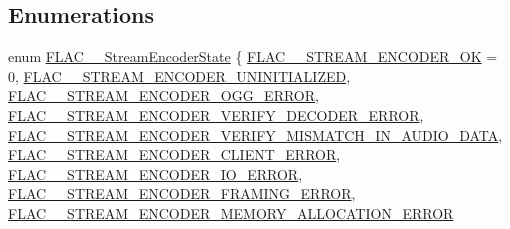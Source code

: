 \subsection*{Enumerations}
\begin{DoxyCompactItemize}
\item 
enum \mbox{\hyperlink{group__flac__stream__encoder_gac5e9db4fc32ca2fa74abd9c8a87c02a5}{F\+L\+A\+C\+\_\+\+\_\+\+Stream\+Encoder\+State}} \{ \newline
\mbox{\hyperlink{group__flac__stream__encoder_ggac5e9db4fc32ca2fa74abd9c8a87c02a5a3a6666ae61a64d955341cec285695bf6}{F\+L\+A\+C\+\_\+\+\_\+\+S\+T\+R\+E\+A\+M\+\_\+\+E\+N\+C\+O\+D\+E\+R\+\_\+\+OK}} = 0, 
\mbox{\hyperlink{group__flac__stream__encoder_ggac5e9db4fc32ca2fa74abd9c8a87c02a5a04912e04a3c57d3c53de34742f96d635}{F\+L\+A\+C\+\_\+\+\_\+\+S\+T\+R\+E\+A\+M\+\_\+\+E\+N\+C\+O\+D\+E\+R\+\_\+\+U\+N\+I\+N\+I\+T\+I\+A\+L\+I\+Z\+ED}}, 
\mbox{\hyperlink{group__flac__stream__encoder_ggac5e9db4fc32ca2fa74abd9c8a87c02a5abb312cc8318c7a541cadacd23ceb3bbb}{F\+L\+A\+C\+\_\+\+\_\+\+S\+T\+R\+E\+A\+M\+\_\+\+E\+N\+C\+O\+D\+E\+R\+\_\+\+O\+G\+G\+\_\+\+E\+R\+R\+OR}}, 
\mbox{\hyperlink{group__flac__stream__encoder_ggac5e9db4fc32ca2fa74abd9c8a87c02a5a4cb80be4f83eb71f04e74968af1d259e}{F\+L\+A\+C\+\_\+\+\_\+\+S\+T\+R\+E\+A\+M\+\_\+\+E\+N\+C\+O\+D\+E\+R\+\_\+\+V\+E\+R\+I\+F\+Y\+\_\+\+D\+E\+C\+O\+D\+E\+R\+\_\+\+E\+R\+R\+OR}}, 
\newline
\mbox{\hyperlink{group__flac__stream__encoder_ggac5e9db4fc32ca2fa74abd9c8a87c02a5a011e3d8b2d02a940bfd0e59c05cf5ae0}{F\+L\+A\+C\+\_\+\+\_\+\+S\+T\+R\+E\+A\+M\+\_\+\+E\+N\+C\+O\+D\+E\+R\+\_\+\+V\+E\+R\+I\+F\+Y\+\_\+\+M\+I\+S\+M\+A\+T\+C\+H\+\_\+\+I\+N\+\_\+\+A\+U\+D\+I\+O\+\_\+\+D\+A\+TA}}, 
\mbox{\hyperlink{group__flac__stream__encoder_ggac5e9db4fc32ca2fa74abd9c8a87c02a5a8c2b2e9efb43a4f9b25b1d2bd9af5f23}{F\+L\+A\+C\+\_\+\+\_\+\+S\+T\+R\+E\+A\+M\+\_\+\+E\+N\+C\+O\+D\+E\+R\+\_\+\+C\+L\+I\+E\+N\+T\+\_\+\+E\+R\+R\+OR}}, 
\mbox{\hyperlink{group__flac__stream__encoder_ggac5e9db4fc32ca2fa74abd9c8a87c02a5af0e4738522e05a7248435c7148f58f91}{F\+L\+A\+C\+\_\+\+\_\+\+S\+T\+R\+E\+A\+M\+\_\+\+E\+N\+C\+O\+D\+E\+R\+\_\+\+I\+O\+\_\+\+E\+R\+R\+OR}}, 
\mbox{\hyperlink{group__flac__stream__encoder_ggac5e9db4fc32ca2fa74abd9c8a87c02a5a2c2937b7f1600a4ac7c84fc70ab34cf1}{F\+L\+A\+C\+\_\+\+\_\+\+S\+T\+R\+E\+A\+M\+\_\+\+E\+N\+C\+O\+D\+E\+R\+\_\+\+F\+R\+A\+M\+I\+N\+G\+\_\+\+E\+R\+R\+OR}}, 
\newline
\mbox{\hyperlink{group__flac__stream__encoder_ggac5e9db4fc32ca2fa74abd9c8a87c02a5a35db99d9958bd6c2301a04715fbc44fd}{F\+L\+A\+C\+\_\+\+\_\+\+S\+T\+R\+E\+A\+M\+\_\+\+E\+N\+C\+O\+D\+E\+R\+\_\+\+M\+E\+M\+O\+R\+Y\+\_\+\+A\+L\+L\+O\+C\+A\+T\+I\+O\+N\+\_\+\+E\+R\+R\+OR}}

\end{DoxyCompactItemize}
